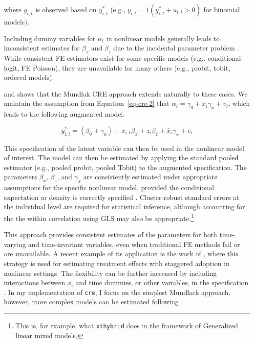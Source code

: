 \documentclass[bib]{statapress}
\begin{document}
where \(y_{i,t}\) is observed based on \(y^*_{i,t}\) (e.g.,
\(y_{i,t} = 1(y^*_{i,t} + u_{i,t} > 0)\) for binomial models).

Including dummy variables for \(\alpha_i\) in nonlinear models generally
leads to inconsistent estimates for \(\beta_x\) and \(\beta_z\) due to
the incidental parameter problem \citep{lancaster2000, neyman1948}.
While consistent FE estimators exist for some specific models (e.g.,
conditional logit, FE Poisson), they are unavailable for many others
(e.g., probit, tobit, ordered models).

\citet{wooldridge2019} and \citet[chap 15.8]{wooldridge2010econometric}
shows that the Mundlak CRE approach extends naturally to these cases. We
maintain the assumption from Equation~\ref{eq-cre-2} that
\(\alpha_i = \gamma_0 + \bar x_{i}\gamma_x + v_i\), which leads to the
following augmented model:

\[y^*_{i,t} = (\beta_0 + \gamma_0) + x_{i,t}\beta_x + z_{i}\beta_z + \bar x_{i}\gamma_x + v_i\]

This specification of the latent variable can then be used in the
nonlinear model of interest. The model can then be estimated by applying
the standard pooled estimator (e.g., pooled probit, pooled Tobit) to the
augmented specification. The parameters \(\beta_x\), \(\beta_z\), and
\(\gamma_x\) are consistently estimated under appropriate assumptions
for the specific nonlinear model, provided the conditional expectation
or density is correctly specified \citep{wooldridge2019}. Cluster-robust
standard errors at the individual level are required for statistical
inference, although accounting for the the within correlation using GLS
may also be appropriate.\footnote{This is, for example, what
  \texttt{xthybrid} does in the framework of Generalized linear mixed
  models.}

This approach provides consistent estimates of the parameters for both
time-varying and time-invariant variables, even when traditional FE
methods fail or are unavailable. A recent example of its application is
the work of \citet{wooldridge2023}, where this strategy is used for
estimating treatment effects with staggered adoption in nonlinear
settings. The flexibility can be further increased by including
interactions between \(\bar x_i\) and time dummies, or other variables,
in the specification \citep{wooldridge2019}. In my implementation of
\texttt{cre}, I focus on the simplest Mundlack approach, however, more
complex models can be estimated following \citet{wooldridge2019}.
\end{document}

